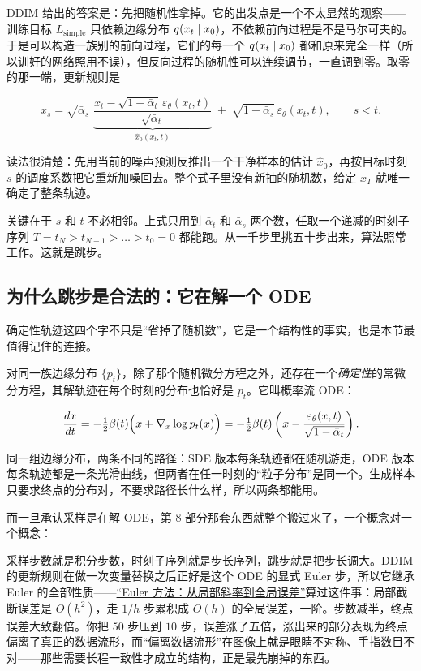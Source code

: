 DDIM 给出的答案是：先把随机性拿掉。它的出发点是一个不太显然的观察——训练目标 \(L_{\mathrm{simple}}\) 只依赖边缘分布 \(q(x_t\mid x_0)\)，不依赖前向过程是不是马尔可夫的。于是可以构造一族别的前向过程，它们的每一个 \(q(x_t\mid x_0)\) 都和原来完全一样（所以训好的网络照用不误），但反向过程的随机性可以连续调节，一直调到零。取零的那一端，更新规则是

\[
x_{s}=\sqrt{\bar\alpha_{s}}\;\underbrace{\frac{x_t-\sqrt{1-\bar\alpha_t}\,\varepsilon_\theta(x_t,t)}{\sqrt{\bar\alpha_t}}}_{\hat x_0(x_t,t)}\;+\;\sqrt{1-\bar\alpha_{s}}\,\varepsilon_\theta(x_t,t),
\qquad s<t .
\]

读法很清楚：先用当前的噪声预测反推出一个干净样本的估计 \(\hat x_0\)，再按目标时刻 \(s\) 的调度系数把它重新加噪回去。整个式子里没有新抽的随机数，给定 \(x_T\) 就唯一确定了整条轨迹。

关键在于 \(s\) 和 \(t\) 不必相邻。上式只用到 \(\bar\alpha_t\) 和 \(\bar\alpha_s\) 两个数，任取一个递减的时刻子序列 \(T=t_N>t_{N-1}>\dots>t_0=0\) 都能跑。从一千步里挑五十步出来，算法照常工作。这就是跳步。

\subsection{为什么跳步是合法的：它在解一个 ODE}

确定性轨迹这四个字不只是``省掉了随机数''，它是一个结构性的事实，也是本节最值得记住的连接。

对同一族边缘分布 \(\{p_t\}\)，除了那个随机微分方程之外，还存在一个\emph{确定性}的常微分方程，其解轨迹在每个时刻的分布也恰好是 \(p_t\)。它叫概率流 ODE：

\[
\frac{dx}{dt}=-\tfrac12\beta(t)\Bigl(x+\nabla_x\log p_t(x)\Bigr)
=-\tfrac12\beta(t)\left(x-\frac{\varepsilon_\theta(x,t)}{\sqrt{1-\bar\alpha_t}}\right).
\]

同一组边缘分布，两条不同的路径：SDE 版本每条轨迹都在随机游走，ODE 版本每条轨迹都是一条光滑曲线，但两者在任一时刻的``粒子分布''是同一个。生成样本只要求终点的分布对，不要求路径长什么样，所以两条都能用。

而一旦承认采样是在解 ODE，第 8 部分那套东西就整个搬过来了，一个概念对一个概念：

采样步数就是积分步数，时刻子序列就是步长序列，跳步就是把步长调大。DDIM 的更新规则在做一次变量替换之后正好是这个 ODE 的显式 Euler 步，所以它继承 Euler 的全部性质——\hyperref[sec:08-Numerical-Analysis/06-ODE/01]{``Euler 方法：从局部斜率到全局误差''}算过这件事：局部截断误差是 \(O(h^2)\)，走 \(1/h\) 步累积成 \(O(h)\) 的全局误差，一阶。步数减半，终点误差大致翻倍。你把 \(50\) 步压到 \(10\) 步，误差涨了五倍，涨出来的部分表现为终点偏离了真正的数据流形，而``偏离数据流形''在图像上就是眼睛不对称、手指数目不对——那些需要长程一致性才成立的结构，正是最先崩掉的东西。

